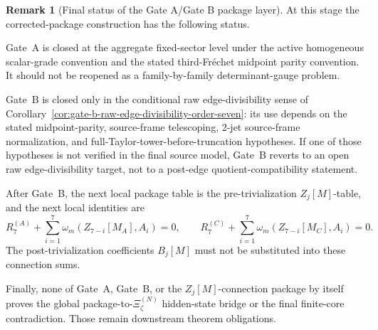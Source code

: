 \documentclass[11pt,a4paper]{amsart}
\theoremstyle{plain}
\theoremstyle{definition}
\newtheorem{remark}[theorem]{Remark}
\begin{document}
\begin{remark}[Final status of the Gate A/Gate B package layer]
\label{rem:final-status-gate-a-gate-b-package-layer}
At this stage the corrected-package construction has the following status.

Gate~A is closed at the aggregate fixed-sector level under the active
homogeneous scalar-grade convention and the stated third-Fr\'echet
midpoint parity convention.  It should not be reopened as a
family-by-family determinant-gauge problem.

Gate~B is closed only in the conditional raw edge-divisibility sense of
Corollary~\ref{cor:gate-b-raw-edge-divisibility-order-seven}: its use
depends on the stated midpoint-parity, source-frame telescoping,
\(2\)-jet source-frame normalization, and full-Taylor-tower-before-truncation
hypotheses.  If one of those hypotheses is not verified in the final
source model, Gate~B reverts to an open raw edge-divisibility target, not
to a post-edge quotient-compatibility statement.

After Gate~B, the next local package table is the pre-trivialization
\(Z_j[M]\)-table, and the next local identities are
\[
R_7^{(A)}+\sum_{i=1}^{7}\omega_m(Z_{7-i}[M_A],A_i)=0,
\qquad
R_7^{(C)}+\sum_{i=1}^{7}\omega_m(Z_{7-i}[M_C],A_i)=0.
\]
The post-trivialization coefficients \(B_j[M]\) must not be substituted
into these connection sums.

Finally, none of Gate~A, Gate~B, or the \(Z_j[M]\)-connection package by
itself proves the global package-to-\(\Xi_\zeta^{(N)}\) hidden-state
bridge or the final finite-core contradiction.  Those remain downstream
theorem obligations.
\end{remark}
\end{document}
